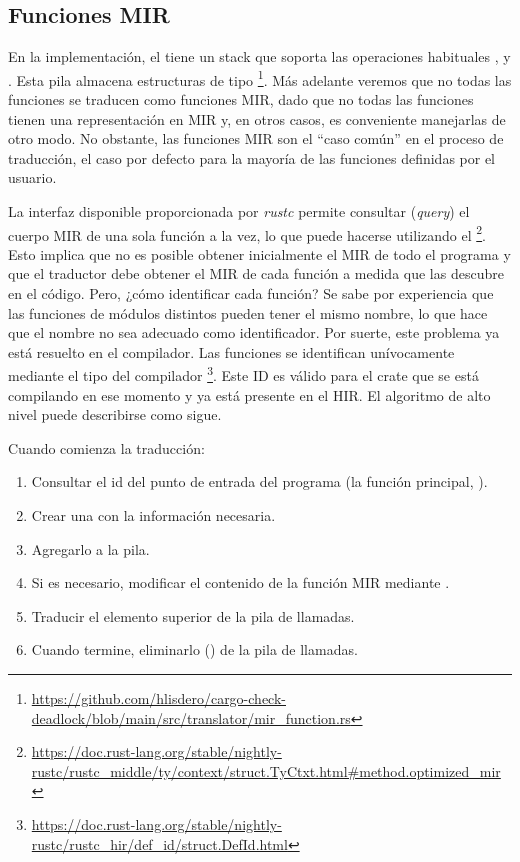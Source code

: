 \subsection{Funciones MIR}

En la implementación, el  tiene un stack que soporta las operaciones habituales ,
 y .
Esta pila almacena estructuras de tipo \footnote{\url{https://github.com/hlisdero/cargo-check-deadlock/blob/main/src/translator/mir_function.rs}}.
Más adelante veremos que no todas las funciones se traducen como funciones MIR,
dado que no todas las funciones tienen una representación en \acrshort{MIR} y,
en otros casos, es conveniente manejarlas de otro modo.
No obstante, las funciones \acrshort{MIR} son el ``caso común'' en el proceso de traducción,
el caso por defecto para la mayoría de las funciones definidas por el usuario.

La interfaz disponible proporcionada por \emph{rustc} permite consultar (\textit{query}) el cuerpo \acrshort{MIR} de una sola función
a la vez, lo que puede hacerse utilizando el
\footnote{\url{https://doc.rust-lang.org/stable/nightly-rustc/rustc_middle/ty/context/struct.TyCtxt.html\#method.optimized\_mir}}.
Esto implica que no es posible obtener inicialmente el \acrshort{MIR} de todo el programa y que el traductor debe
obtener el \acrshort{MIR} de cada función a medida que las descubre en el código.
Pero, ¿cómo identificar cada función? Se sabe por experiencia que las funciones de módulos distintos
pueden tener el mismo nombre, lo que hace que el nombre no sea adecuado como
identificador. Por suerte, este problema ya está resuelto en el compilador. Las funciones se
identifican unívocamente mediante el tipo del compilador
\footnote{\url{https://doc.rust-lang.org/stable/nightly-rustc/rustc_hir/def_id/struct.DefId.html}}.
Este ID es válido para el crate que se está compilando en ese momento y ya está presente en el \acrshort{HIR}.
El algoritmo de alto nivel puede describirse como sigue.

Cuando comienza la traducción:

\begin{enumerate}
    \item Consultar el id del punto de entrada del programa (la función principal, ).
    \item Crear una  con la información necesaria.
    \item Agregarlo a la pila.
    \item Si es necesario, modificar el contenido de la función \acrshort{MIR} mediante .
    \item Traducir el elemento superior de la pila de llamadas.
    \item Cuando  termine, eliminarlo () de la pila de llamadas.
\end{enumerate}

